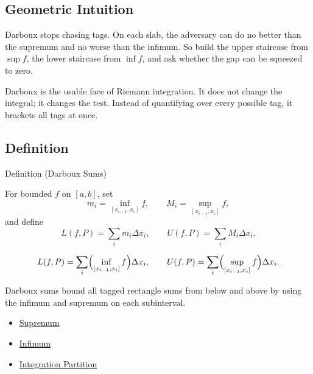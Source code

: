 \subsection*{Geometric Intuition}

\begin{exposition}
Darboux stops chasing tags. On each slab, the adversary can do no better than
the supremum and no worse than the infimum. So build the upper staircase from
\(\sup f\), the lower staircase from \(\inf f\), and ask whether the gap can be
squeezed to zero.
\end{exposition}

\begin{remark*}[Interpretation]
Darboux is the usable face of Riemann integration. It does not change the
integral; it changes the test. Instead of quantifying over every possible tag,
it brackets all tags at once.
\end{remark*}

\subsection*{Definition}

\begin{definitionbox}{Definition (Darboux Sums)}
\begin{definition}
\label{def:darboux-sums}
For bounded \(f\) on \([a,b]\), set
\[
  m_i=\inf_{[x_{i-1},x_i]}f,\qquad
  M_i=\sup_{[x_{i-1},x_i]}f,
\]
and define
\[
  L(f,P)=\sum_i m_i\Delta x_i,\qquad
  U(f,P)=\sum_i M_i\Delta x_i.
\]
\end{definition}
\end{definitionbox}

\begin{remark*}
\[
L(f,P)=\sum_i\Bigl(\inf_{[x_{i-1},x_i]}f\Bigr)\Delta x_i,
\qquad
U(f,P)=\sum_i\Bigl(\sup_{[x_{i-1},x_i]}f\Bigr)\Delta x_i.
\]
\end{remark*}

\begin{remark*}[Interpretation]
Darboux sums bound all tagged rectangle sums from below and above by using the
infimum and supremum on each subinterval.
\end{remark*}

\begin{dependencies}
\begin{itemize}
  \item \hyperref[def:supremum]{Supremum}
  \item \hyperref[def:infimum]{Infimum}
  \item \hyperref[def:integration-partition]{Integration Partition}
\end{itemize}
\end{dependencies}

